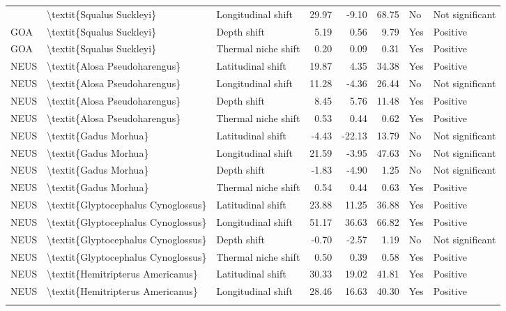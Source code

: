 \begin{longtable}[t]{lllrrrll}
{{\addlinespace
GOA & \textbackslash{}textit\{Squalus Suckleyi\} & Longitudinal shift & 29.97 & -9.10 & 68.75 & No & Not significant\\
GOA & \textbackslash{}textit\{Squalus Suckleyi\} & Depth shift & 5.19 & 0.56 & 9.79 & Yes & Positive\\
GOA & \textbackslash{}textit\{Squalus Suckleyi\} & Thermal niche shift & 0.20 & 0.09 & 0.31 & Yes & Positive\\
NEUS & \textbackslash{}textit\{Alosa Pseudoharengus\} & Latitudinal shift & 19.87 & 4.35 & 34.38 & Yes & Positive\\
NEUS & \textbackslash{}textit\{Alosa Pseudoharengus\} & Longitudinal shift & 11.28 & -4.36 & 26.44 & No & Not significant\\
\addlinespace
NEUS & \textbackslash{}textit\{Alosa Pseudoharengus\} & Depth shift & 8.45 & 5.76 & 11.48 & Yes & Positive\\
NEUS & \textbackslash{}textit\{Alosa Pseudoharengus\} & Thermal niche shift & 0.53 & 0.44 & 0.62 & Yes & Positive\\
NEUS & \textbackslash{}textit\{Gadus Morhua\} & Latitudinal shift & -4.43 & -22.13 & 13.79 & No & Not significant\\
NEUS & \textbackslash{}textit\{Gadus Morhua\} & Longitudinal shift & 21.59 & -3.95 & 47.63 & No & Not significant\\
NEUS & \textbackslash{}textit\{Gadus Morhua\} & Depth shift & -1.83 & -4.90 & 1.25 & No & Not significant\\
\addlinespace
NEUS & \textbackslash{}textit\{Gadus Morhua\} & Thermal niche shift & 0.54 & 0.44 & 0.63 & Yes & Positive\\
NEUS & \textbackslash{}textit\{Glyptocephalus Cynoglossus\} & Latitudinal shift & 23.88 & 11.25 & 36.88 & Yes & Positive\\
NEUS & \textbackslash{}textit\{Glyptocephalus Cynoglossus\} & Longitudinal shift & 51.17 & 36.63 & 66.82 & Yes & Positive\\
NEUS & \textbackslash{}textit\{Glyptocephalus Cynoglossus\} & Depth shift & -0.70 & -2.57 & 1.19 & No & Not significant\\
NEUS & \textbackslash{}textit\{Glyptocephalus Cynoglossus\} & Thermal niche shift & 0.50 & 0.39 & 0.58 & Yes & Positive\\
\addlinespace
NEUS & \textbackslash{}textit\{Hemitripterus Americanus\} & Latitudinal shift & 30.33 & 19.02 & 41.81 & Yes & Positive\\
NEUS & \textbackslash{}textit\{Hemitripterus Americanus\} & Longitudinal shift & 28.46 & 16.63 & 40.30 & Yes & Positive\\
}}
\end{longtable}

